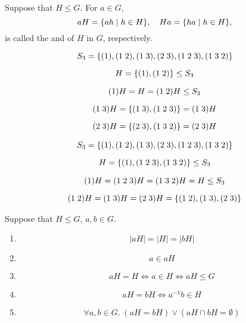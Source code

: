 
\begin{frame}
  \begin{definition}[Coset (陪集))]
    Suppose that $H \le G$.
    For $a \in G$,
    \[
      aH = \{ah \mid h \in H\}, \quad Ha = \{ha \mid h \in H\},
    \]
    is called the 
    and  of $H$ in $G$, respectively.
  \end{definition}
\end{frame}

\begin{frame}
  \[
    S_{3} = \{(1), (1\; 2), (1\; 3), (2\; 3), (1\; 2\; 3), (1\; 3\; 2)\}
  \]

  \[
    H = \{(1), (1\; 2)\} \le S_{3}
  \]

  \pause
  \begin{gather*}
    (1) H = H = (1\; 2) H \le S_{3} \\[6pt]
    (1\; 3) H = \{(1\; 3), (1\; 2\; 3)\} = (1\; 3)H \\[6pt]
    (2\; 3) H = \{(2\; 3), (1\; 3\; 2)\} = (2\; 3)H
  \end{gather*}
\end{frame}

\begin{frame}
  \[
    S_{3} = \{(1), (1\; 2), (1\; 3), (2\; 3), (1\; 2\; 3), (1\; 3\; 2)\}
  \]

  \[
    H = \{(1), (1\; 2\; 3), (1\; 3\; 2)\} \le S_{3}
  \]

  \pause
  \begin{gather*}
    (1)H = (1\;2\;3)H = (1\;3\;2)H = H \le S_{3} \\[6pt]
    (1\;2) H = (1\;3)H = (2\;3)H = \{(1\;2), (1\;3), (2\;3)\}
  \end{gather*}
\end{frame}

\begin{frame}{}
  \begin{theorem}
    Suppose that $H \le G$, $a, b \in G$.
    \begin{enumerate}[(1)]
      \item
        \[
          |aH| = |H| = |bH|
        \]
      \item
        \[
          a \in aH
        \]
      \item
        \[
          aH = H \iff a \in H \iff aH \le G
        \]
      \item
        \[
          aH = bH \iff a^{-1}b \in H
        \]
      \item
        \[
          \forall a, b \in G.\; (aH = bH) \lor (aH \cap bH = \emptyset)
        \]
    \end{enumerate}
  \end{theorem}
\end{frame}


